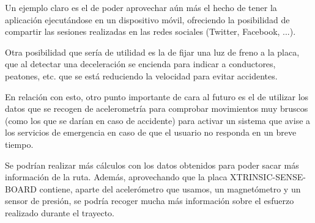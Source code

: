 Un ejemplo claro es el de poder aprovechar aún más el hecho de tener la aplicación ejecutándose en un dispositivo móvil, ofreciendo la posibilidad de compartir las sesiones realizadas en las redes sociales (Twitter, Facebook, ...).

Otra posibilidad que sería de utilidad es la de fijar una luz de freno a la placa, que al detectar una deceleración se encienda para indicar a conductores, peatones, etc. que se está reduciendo la velocidad para evitar accidentes.

En relación con esto, otro punto importante de cara al futuro es el de utilizar los datos que se recogen de acelerometría para comprobar movimientos muy bruscos (como los que se darían en caso de accidente) para activar un sistema que avise a los servicios de emergencia en caso de que el usuario no responda en un breve tiempo.

Se podrían realizar más cálculos con los datos obtenidos para poder sacar más información de la ruta. Además, aprovechando que la placa XTRINSIC-SENSE-BOARD contiene, aparte del acelerómetro que usamos, un magnetómetro y un sensor de presión, se podría recoger mucha más información sobre el esfuerzo realizado durante el trayecto.

